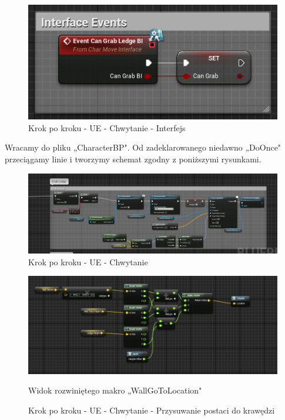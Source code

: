 \documentclass[12pt]{xmgr}
\begin{document}
\begin{figure}[!htb]
    \begin{center}
    \includegraphics[scale=0.5]{Screeny/UeKrokPoKroku/CanGrabInterface}
    \end{center}
    \caption{Krok po kroku - UE - Chwytanie - Interfejs}
\end{figure}

\newpage
Wracamy do pliku „CharacterBP". Od zadeklarowanego niedawno „DoOnce" przeciągamy linie i tworzymy schemat zgodny z poniższymi rysunkami.

\begin{figure}[!htb]
    \begin{center}
    \includegraphics[scale=0.5]{Screeny/UeKrokPoKroku/GrabLedge}
    \end{center}
    \caption{Krok po kroku - UE - Chwytanie}
\end{figure}

\begin{figure}[!htb]
    \begin{center}
    \includegraphics[scale=0.5]{Screeny/UeKrokPoKroku/WallGoToLocation}
    \end{center}
    \caption{Krok po kroku - UE - Chwytanie - Przysuwanie postaci do krawędzi}
    Widok rozwiniętego makro „WallGoToLocation"
\end{figure}
\end{document}
